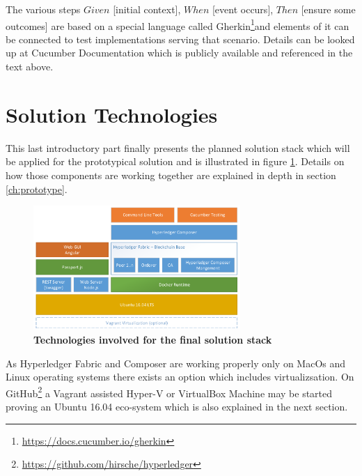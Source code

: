 The various steps $Given$ [initial context], $When$ [event occurs], $Then$ [ensure some outcomes] are based on a special language called Gherkin\footnote{\url{https://docs.cucumber.io/gherkin}}and elements of it can be connected to test implementations serving that scenario. Details can be looked up at Cucumber Documentation which is publicly available and referenced in the text above.
  
\section{Solution Technologies}
\label{sec:solution}

This last introductory part finally presents the planned solution stack which will be applied for the prototypical solution and is illustrated in figure \ref{fig:solution-stack}. Details on how those components are working together are explained in depth in section \ref{ch:prototype}.

\begin{figure}[htbp]
  \centering
  \includegraphics[width=0.7\textwidth, clip, trim=1mm 1mm 1mm 1mm]{Figures/solution-stack}
  \caption{\bf\small Technologies involved for the final solution stack}
  \label{fig:solution-stack}
\end{figure}

As Hyperledger Fabric and Composer are working properly only on MacOs and Linux operating systems there exists an option which includes virtualizsation. On GitHub\footnote{\url{https://github.com/hirsche/hyperledger}} a Vagrant assisted Hyper-V or VirtualBox Machine may be started proving an Ubuntu 16.04 eco-system which is also explained in the next section.